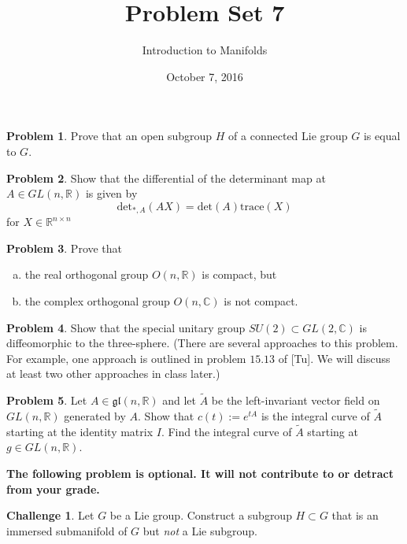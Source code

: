 \documentclass{amsart}
\newcommand{\+}[1]{\ensuremath{\mathbf{#1}}}
\newcommand{\C}{{\mathbb C}}
\newcommand{\R}{{\mathbb R}}
\theoremstyle{definition}
\newtheorem{prob}{Problem}
\newtheorem{chal}{Challenge}
\begin{document}
\title{Problem Set 7}
\date{October 7, 2016}
\author{Introduction to Manifolds}

\maketitle

\begin{prob}
 Prove that an open subgroup $H$ of a connected Lie group $G$ is equal to $G$.
\end{prob}

\begin{prob}
 Show that the differential of the determinant map at $A \in GL(n,\R)$ is given by
 \[
 \text{det}_{*,A}(AX) = \text{det}(A)\text{trace}(X)
 \]
 for $X \in \R^{n \times n}$
\end{prob}



\begin{prob}
Prove that 
\begin{enumerate}[(a)]
 \item the real orthogonal group $O(n,\R)$ is compact, but
 \item the complex orthogonal group $O(n,\C)$ is not compact.
\end{enumerate}
\end{prob}


\begin{prob}
Show that the special unitary group $SU(2) \subset GL(2,\C)$
is diffeomorphic to the three-sphere.
(There are several approaches to this problem.  For example, one approach is
outlined in problem $15.13$ of [Tu].  We will discuss at least two other approaches in class later.)
 \end{prob}

 \begin{prob}
Let $A \in \mathfrak{gl}(n,\R)$ and let $\tilde{A}$ be the
left-invariant vector field on $GL(n,\R)$ generated by $A$.
Show that $c(t) := e^{tA}$ is the integral curve of $\tilde{A}$
starting at the identity matrix $I$.
Find the integral curve of $\tilde{A}$ starting at $g \in GL(n,\R)$.
 \end{prob}

 
 \vspace{5mm}

{\bf The following problem is optional.  It
will not contribute to or detract from your grade.}
 
\vspace{5mm}

\begin{chal}
Let $G$ be a Lie group.  Construct a subgroup $H \subset G$ that is an immersed submanifold of $G$ but \emph{not} 
a Lie subgroup.
\end{chal}
\end{document}
